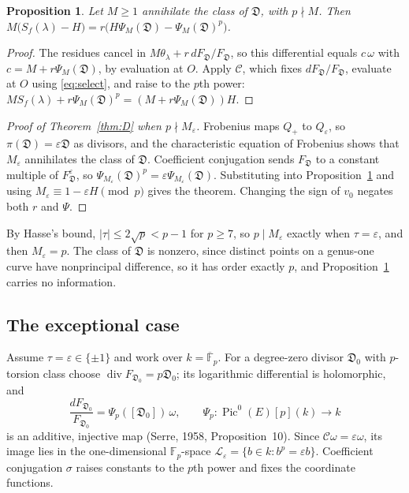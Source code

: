 \documentclass[11pt,a4paper]{article}
\numberwithin{equation}{section}
\theoremstyle{plain}
\newtheorem{proposition}[theorem]{Proposition}
\theoremstyle{definition}
\DeclareMathOperator{\Pic}{Pic}
\DeclareMathOperator{\divisor}{div}
\newcommand{\F}{\mathbb{F}}
\newcommand{\C}{\mathcal{C}}
\newcommand{\D}{\mathfrak{D}}
\newcommand{\eps}{\varepsilon}
\begin{document}
\begin{proposition}\label{prop:regular}
Let $M\ge1$ annihilate the class of $\D$, with $p\nmid M$. Then $M\bigl(S_f(\lambda)-H\bigr)=r\bigl(H\Psi_M(\D)-\Psi_M(\D)^p\bigr)$.
\end{proposition}

\begin{proof}
The residues cancel in $M\theta_\lambda+r\,dF_\D/F_\D$, so this differential equals $c\,\omega$ with $c=M+r\Psi_M(\D)$, by evaluation at $O$. Apply $\C$, which fixes $dF_\D/F_\D$, evaluate at $O$ using \eqref{eq:select}, and raise to the $p$th power: $MS_f(\lambda)+r\Psi_M(\D)^p=(M+r\Psi_M(\D))H$.
\end{proof}

\begin{proof}[Proof of Theorem~\ref{thm:D} when $p\nmid M_\eps$]
Frobenius maps $Q_+$ to $Q_\eps$, so $\pi(\D)=\eps\D$ as divisors, and the characteristic equation of Frobenius shows that $M_\eps$ annihilates the class of $\D$. Coefficient conjugation sends $F_\D$ to a constant multiple of $F_\D^{\eps}$, so $\Psi_{M_\eps}(\D)^p=\eps\Psi_{M_\eps}(\D)$. Substituting into Proposition~\ref{prop:regular} and using $M_\eps\equiv1-\eps H\pmod p$ gives the theorem. Changing the sign of $v_0$ negates both $r$ and $\Psi$.
\end{proof}

By Hasse's bound, $|\tau|\le2\sqrt p<p-1$ for $p\ge7$, so $p\mid M_\eps$ exactly when $\tau=\eps$, and then $M_\eps=p$. The class of $\D$ is nonzero, since distinct points on a genus-one curve have nonprincipal difference, so it has order exactly $p$, and Proposition~\ref{prop:regular} carries no information.

\subsection{The exceptional case}
Assume $\tau=\eps\in\{\pm1\}$ and work over $k=\overline{\F}_p$. For a degree-zero divisor $\D_0$ with $p$-torsion class choose $\divisor F_{\D_0}=p\D_0$; its logarithmic differential is holomorphic, and
\begin{equation}\label{eq:transfer}
\frac{dF_{\D_0}}{F_{\D_0}}=\Psi_p([\D_0])\,\omega,\qquad \Psi_p:\Pic^0(E)[p](k)\to k
\end{equation}
is an additive, injective map (Serre, 1958, Proposition~10). Since $\C\omega=\eps\omega$, its image lies in the one-dimensional $\F_p$-space $\mathscr L_\eps=\{b\in k:b^p=\eps b\}$. Coefficient conjugation $\sigma$ raises constants to the $p$th power and fixes the coordinate functions.
\end{document}
